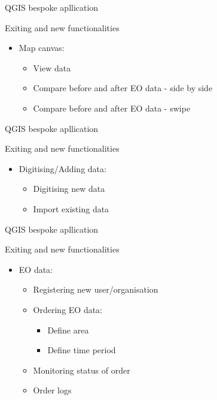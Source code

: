 \begin{frame}{QGIS bespoke apllication}
	\begin{block}{Exiting and new functionalities}
		\begin{itemize}
			\item Map canvas:
			\begin{itemize}
				\item View data
				\item Compare before and after EO data - side by side
				\item Compare before and after EO data - swipe
			\end{itemize}
		\end{itemize}
	\end{block}
\end{frame}

\begin{frame}{QGIS bespoke apllication}
	\begin{block}{Exiting and new functionalities}
		\begin{itemize}
			\item Digitising/Adding data:
			\begin{itemize}
				\item Digitising new data
				\item Import existing data
			\end{itemize}
		\end{itemize}
	\end{block}
\end{frame}

\begin{frame}{QGIS bespoke apllication}
	\begin{block}{Exiting and new functionalities}
		\begin{itemize}
			\item EO data:
			\begin{itemize}
				\item Registering new user/organisation
				\item Ordering EO data:
					\begin{itemize}
						\item Define area
						\item Define time period
					\end{itemize}
				\item Monitoring status of order
				\item Order logs
			\end{itemize}
		\end{itemize}
	\end{block}
\end{frame}

